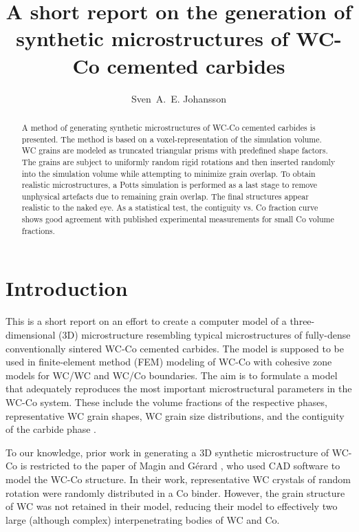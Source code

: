 \documentclass[10pt,a4paper]{article}
\title{A short report on the generation of synthetic microstructures of WC-Co cemented carbides}
\author{Sven~A.~E. Johansson}
\affil{Department of Applied Physics, Chalmers University of Technology, SE-412 96 G{\"o}teborg, Sweden\\
Chalmers industriteknik, Sven Hultins gata 9D, SE-412 88 G{\"o}teborg, Sweden}
\begin{document}
\maketitle

\begin{abstract}
	A method of generating synthetic microstructures of WC-Co cemented carbides is presented. The method is based on a voxel-representation of the simulation volume. WC grains are modeled as truncated triangular prisms with predefined shape factors. The grains are subject to uniformly random rigid rotations and then inserted randomly into the simulation volume while attempting to minimize grain overlap. To obtain realistic microstructures, a Potts simulation is performed as a last stage to remove unphysical artefacts due to remaining grain overlap. The final structures appear realistic to the naked eye. As a statistical test, the contiguity vs. Co fraction curve shows good agreement with published experimental measurements for small Co volume fractions.
\end{abstract}



\section{Introduction}
This is a short report on an effort to create a computer model of a three-dimensional (3D) microstructure resembling typical microstructures of fully-dense conventionally sintered WC-Co cemented carbides. The model is supposed to be used in finite-element method (FEM) modeling of WC-Co with cohesive zone models for WC/WC and WC/Co boundaries. The aim is to formulate a model that adequately reproduces the most important microstructural parameters in the WC-Co system. These include the volume fractions of the respective phases,  representative WC grain shapes,  WC grain size distributions, and the contiguity of the carbide phase \cite{Ex79,LaMi14}.

To our knowledge, prior work in generating a 3D synthetic microstructure of WC-Co is restricted to the paper of Magin and G{\'e}rard \cite{MaGe09}, who used CAD software to model the WC-Co structure. In their work, representative WC crystals of random rotation were randomly distributed in a Co binder. However, the grain structure of WC was not retained in their model, reducing their model to effectively two large (although complex) interpenetrating bodies of WC and Co. %
\end{document}
